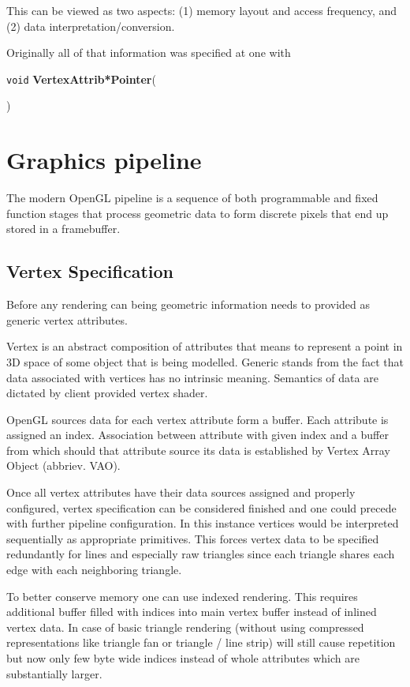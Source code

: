 This can be viewed as two aspects: (1) memory layout and access frequency, and (2) data interpretation/conversion.

Originally all of that information was specified at one with
\begin{center}
    \texttt{void} \textbf{VertexAttrib*Pointer}(

    )
\end{center}

\section{Graphics pipeline}

The modern OpenGL pipeline is a sequence of both programmable and fixed function stages that process geometric data to form discrete pixels that end up stored in a framebuffer. 

\subsection{Vertex Specification}

Before any rendering can being geometric information needs to provided as generic vertex attributes.

Vertex is an abstract composition of attributes that means to represent a point in 3D space of some object that is being modelled.
Generic stands from the fact that data associated with vertices has no intrinsic meaning.
Semantics of data are dictated by client provided vertex shader.

OpenGL sources data for each vertex attribute form a buffer. Each attribute is assigned an index.
Association between attribute with given index and a buffer from which should that attribute source its data is established by Vertex Array Object (abbriev. VAO).

Once all vertex attributes have their data sources assigned and properly configured, vertex specification can be considered finished and one could precede with further pipeline configuration.
In this instance vertices would be interpreted sequentially as appropriate primitives. This forces vertex data to be specified redundantly for lines and especially raw triangles since each triangle shares each edge with each neighboring triangle.

To better conserve memory one can use indexed rendering. This requires additional buffer filled with indices into main vertex buffer instead of inlined vertex data.
In case of basic triangle rendering (without using compressed representations like triangle fan or triangle / line strip) will still cause repetition but now only few byte wide indices instead of whole attributes which are substantially larger.

